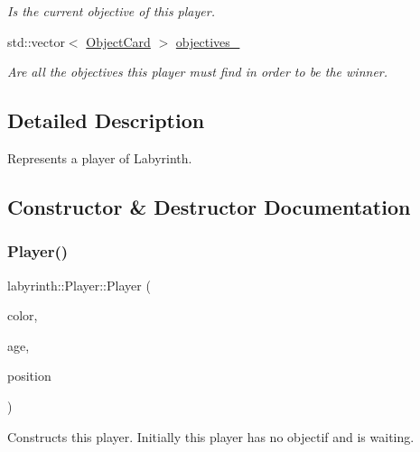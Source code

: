 \begin{DoxyCompactItemize}
\begin{DoxyCompactList}\small\item\em Is the current objective of this player. \end{DoxyCompactList}\item 
\mbox{\label{structlabyrinth_1_1_player_a9012256383a45a39751015816117f618}} 
std\+::vector$<$ \mbox{\hyperlink{structlabyrinth_1_1_object_card}{Object\+Card}} $>$ \mbox{\hyperlink{structlabyrinth_1_1_player_a9012256383a45a39751015816117f618}{objectives\+\_\+}}
\begin{DoxyCompactList}\small\item\em Are all the objectives this player must find in order to be the winner. \end{DoxyCompactList}\end{DoxyCompactItemize}


\subsection{Detailed Description}
Represents a player of Labyrinth. 

\subsection{Constructor \& Destructor Documentation}
\mbox{\label{structlabyrinth_1_1_player_adb42eb8f577c39df39be8359642c67ca}} 
\subsubsection{\texorpdfstring{Player()}{Player()}}
{\footnotesize\ttfamily labyrinth\+::\+Player\+::\+Player (\begin{DoxyParamCaption}\item[{\mbox{\hyperlink{structlabyrinth_1_1_player_a23119c6cf615f70b86380d07ab692c75}{Player\+Color}}}]{color,  }\item[{unsigned}]{age,  }\item[{Maze\+Position}]{position }\end{DoxyParamCaption})\hspace{0.3cm}{\ttfamily [inline]}}



Constructs this player. Initially this player has no objectif and is waiting. 


